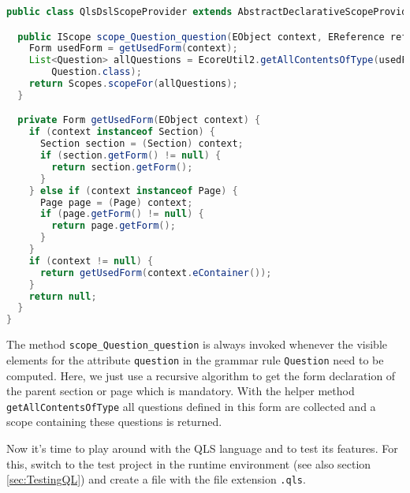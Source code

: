 \begin{lstlisting}[language=Java]
public class QlsDslScopeProvider extends AbstractDeclarativeScopeProvider {

  public IScope scope_Question_question(EObject context, EReference reference) {
    Form usedForm = getUsedForm(context);
    List<Question> allQuestions = EcoreUtil2.getAllContentsOfType(usedForm,
        Question.class);
    return Scopes.scopeFor(allQuestions);
  }

  private Form getUsedForm(EObject context) {
    if (context instanceof Section) {
      Section section = (Section) context;
      if (section.getForm() != null) {
        return section.getForm();
      }
    } else if (context instanceof Page) {
      Page page = (Page) context;
      if (page.getForm() != null) {
        return page.getForm();
      }
    }
    if (context != null) {
      return getUsedForm(context.eContainer());
    }
    return null;
  }
}
\end{lstlisting}

The method \texttt{scope\_Question\_question} is always invoked whenever the visible
elements for the attribute \texttt{question} in the grammar rule \texttt{Question} 
need to be computed. Here, we just use a recursive algorithm to get the form declaration
of the parent section or page which is mandatory. With the helper method \texttt{getAllContentsOfType}
all questions defined in this form are collected and a scope containing these questions is returned.

Now it's time to play around with the QLS language and to test its features. For this,
switch to the test project in the runtime environment (see also section \ref{sec:TestingQL})
and create a file with the file extension \texttt{.qls}.